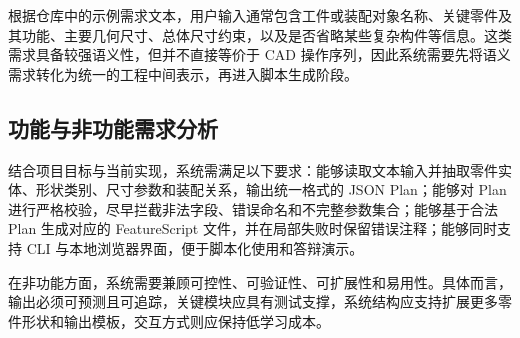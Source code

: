 根据仓库中的示例需求文本，用户输入通常包含工件或装配对象名称、关键零件及其功能、主要几何尺寸、总体尺寸约束，以及是否省略某些复杂构件等信息。这类需求具备较强语义性，但并不直接等价于 CAD 操作序列，因此系统需要先将语义需求转化为统一的工程中间表示，再进入脚本生成阶段。

\subsection{功能与非功能需求分析}

结合项目目标与当前实现，系统需满足以下要求：能够读取文本输入并抽取零件实体、形状类别、尺寸参数和装配关系，输出统一格式的 JSON Plan；能够对 Plan 进行严格校验，尽早拦截非法字段、错误命名和不完整参数集合；能够基于合法 Plan 生成对应的 FeatureScript 文件，并在局部失败时保留错误注释；能够同时支持 CLI 与本地浏览器界面，便于脚本化使用和答辩演示。

在非功能方面，系统需要兼顾可控性、可验证性、可扩展性和易用性。具体而言，输出必须可预测且可追踪，关键模块应具有测试支撑，系统结构应支持扩展更多零件形状和输出模板，交互方式则应保持低学习成本。
